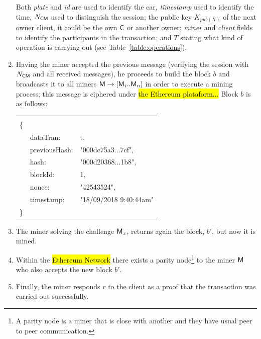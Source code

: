 \begin{enumerate}
        Both \textit{plate} and \textit{id} are used to identify the car, 
        \textit{timestamp} used to identify the time, $N_{\textsf{C}\textsf{M}}$
        used to distinguish the session; the public key $K_{pub(X)}$
        of the next owner client, it could be the own $\textsf{C}$ or another
        owner;
        \textit{miner} and 
        \textit{client} fields to identify the participants in the transaction; 
        and $T$ stating
        what kind of operation is carrying out (see Table~\ref{table:operations}).
    \item Having the miner accepted the previous message (verifying the  
        session with $N_{\textsf{C}\textsf{M}}$ and all received messages), he proceeds to build 
        the block $b$ and broadcasts it to all miners $\textsf{M}\rightarrow [\textsf{M}_i .. \textsf{M}_n]$
        in order to execute a mining process; 
        this message is ciphered under \hl{the Ethereum plataform...}
        Block $b$ is as follows:
        \begin{tabular}{lll}
                &               & \\ 
            \{  &               &    \\
                & dataTran:     & t,  \\
                & previousHash: & "000dc75a3...7cf", \\
                & hash:         & "000d20368...1b8",\\
                & blockId:      & 1,\\
                & nonce:        & "42543524",\\
                & timestamp:    & "18/09/2018 9:40:44am" \\
            \}  &               &   \\
        \end{tabular}
        
    \item The miner solving the challenge $\textsf{M}_x$, returns again the block, $b'$, 
        but now it is mined. 
    \item Within the \hl{Ethereum Network} there exists a parity node\footnote{
            A parity node is a miner that is close with another and they have usual
            peer to peer communication.
        } to the miner $\textsf{M}$
        who also accepts the new block $b'$.
    \item Finally, the miner responds $r$ to the client as a proof that the transaction 
        was carried out successfully.
\end{enumerate}

